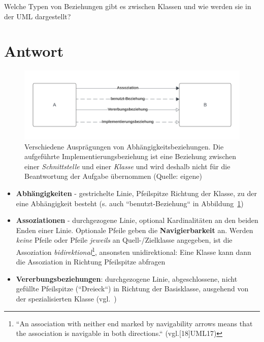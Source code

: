 Welche Typen von Beziehungen gibt es zwischen Klassen und wie werden sie in der UML dargestellt?


\section*{Antwort}

\begin{figure}
    \centering
    \includegraphics[scale=0.4]{chapters/aufgabe 1/img/umldependencies}
    \caption{Verschiedene Ausprägungen von Abhängigkeitsbeziehungen. Die aufgeführte Implementierungsbeziehung ist eine Beziehung zwischen einer \textit{Schnittstelle} und einer \textit{Klasse} und wird deshalb nicht für die Beantwortung der Aufgabe übernommen  (Quelle: eigene)}
    \label{fig:umldependencies}
\end{figure}

\begin{itemize}
    \item \textbf{Abhängigkeiten} - gestrichelte Linie, Pfeilspitze Richtung der Klasse, zu der eine Abhängigkeit besteht (s. auch ``benutzt-Beziehung`` in Abbildung~\ref{fig:umldependencies})
    \item \textbf{Assoziationen} - durchgezogene Linie, optional Kardinalitäten an den beiden Enden einer Linie.
    Optionale Pfeile geben die \textbf{Navigierbarkeit} an.
    Werden \textit{keine} Pfeile oder Pfeile \textit{jeweils} an Quell-/Zielklasse angegeben, ist die Assoziation \textit{bidirektional}\footnote{
    ``An association with neither end marked by navigability arrows means that the association is navigable in both
    directions.`` (vgl.[18]{UML17})
    }, ansonsten unidirektional: Eine Klasse kann dann die Assoziation in Richtung Pfeilspitze abfragen
    \item \textbf{Vererbungsbeziehungen}: durchgezogene Linie, abgeschlossene, nicht gefüllte Pfeilspitze (``Dreieck``) in Richtung der Basisklasse, ausgehend von der spezialisierten Klasse (vgl.~\cite[52]{Bal05})
\end{itemize}
